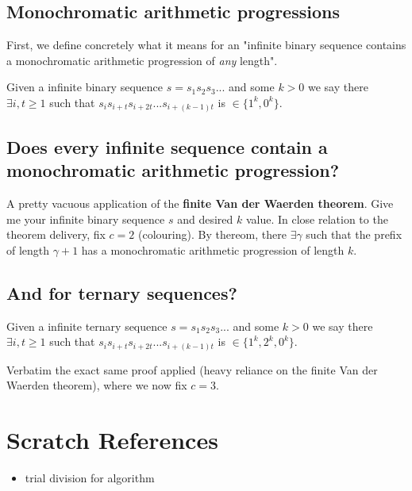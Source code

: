 \documentclass{article}
\begin{document}
\subsection{Monochromatic arithmetic progressions}
First, we define concretely what it means for an "infinite binary sequence contains a monochromatic arithmetic progression of \emph{any} length". 

Given a infinite binary sequence $s = s_{1}s_{2}s_{3}...$ and some $k>0$ we say there $\exists i,t \geq 1$ such that $s_{i}s_{i+t}s_{i+2t}...s_{i+(k-1)t}$ is $\in \{1^k,0^k\}$.

\subsection{Does every infinite sequence contain a monochromatic arithmetic progression?}
A pretty vacuous application of the \textbf{finite Van der Waerden theorem}. Give me your infinite binary sequence $s$ and desired $k$ value. In close relation to the theorem delivery, fix $c = 2$ (colouring). By thereom, there $\exists \gamma$ such that the prefix of length $\gamma + 1$ has a monochromatic arithmetic progression of length $k$.

\subsection{And for ternary sequences?} 
Given a infinite ternary sequence $s = s_{1}s_{2}s_{3}...$ and some $k>0$ we say there $\exists i,t \geq 1$ such that $s_{i}s_{i+t}s_{i+2t}...s_{i+(k-1)t}$ is $\in \{1^k,2^k,0^k\}$.

Verbatim the exact same proof applied (heavy reliance on the finite Van der Waerden theorem), where we now fix $c = 3$.

\section{Scratch References}
\begin{itemize}
	\item trial division for algorithm
\end{itemize}
\end{document}
